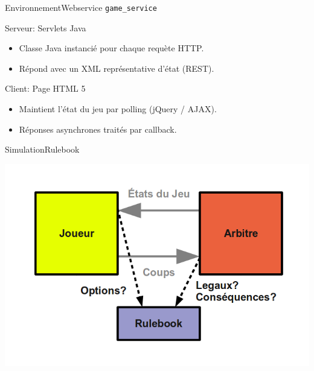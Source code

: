 
\begin{frame}{Environnement}{Webservice \texttt{game\_service}}

\begin{block}{Serveur: Servlets Java}
\begin{itemize}
\item Classe Java instancié pour chaque requète HTTP.
\item Répond avec un XML représentative d'état (REST).
\end{itemize}
\end{block}

\pause

\begin{block}{Client: Page HTML 5}
\begin{itemize}
\item Maintient l'état du jeu par polling (jQuery / AJAX).
\item Réponses asynchrones traités par callback.
\end{itemize}
\end{block}


\end{frame}



\begin{frame}{Simulation}{Rulebook}

\includegraphics[width=\textwidth]{img/env_sim/rulebook}

\end{frame}


